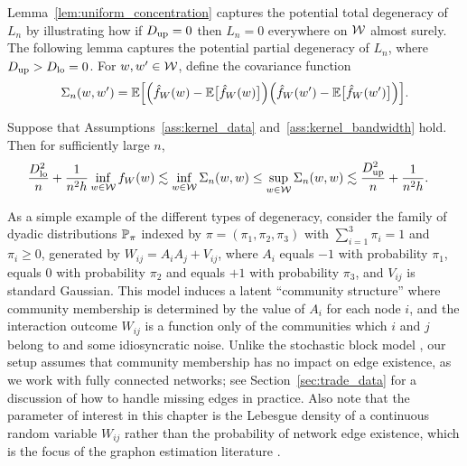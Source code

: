 Lemma~\ref{lem:uniform_concentration} captures the potential total degeneracy
of $L_n$ by illustrating how if $\Du=0$ then $L_n=0$ everywhere on $\cW$ almost
surely. The following lemma captures the potential partial degeneracy of $L_n$,
where $\Du > \Dl = 0$. For $w,w' \in \cW$, define the covariance function
%
\begin{align*}
  \Sigma_n(w,w') =
  \E\Big[
    \Big(
      \hat f_W(w)
      - \E\big[\hat f_W(w)\big]
    \Big)
    \Big(
      \hat f_W(w')
      - \E\big[\hat f_W(w')\big]
    \Big)
  \Big].
\end{align*}
%
\begin{lemma}
  \label{lem:variance_bounds}
  Suppose that Assumptions~\ref{ass:kernel_data} and~\ref{ass:kernel_bandwidth}
  hold. Then for sufficiently large $n$,
  \begin{align*}
    \frac{\Dl^2}{n} + \frac{1}{n^2h}
    \inf_{w \in \cW} f_W(w)
    &\lesssim
    \inf_{w \in \cW} \Sigma_n(w,w)
    \leq
    \sup_{w \in \cW} \Sigma_n(w,w)
    \lesssim
    \frac{\Du^2}{n} + \frac{1}{n^2h}.
  \end{align*}
\end{lemma}

As a simple example of the different types of degeneracy, consider the family
of dyadic distributions $\P_{\pi}$ indexed by $\pi = (\pi_1, \pi_2, \pi_3)$
with $\sum_{i=1}^3 \pi_i = 1$ and $\pi_i \geq 0$, generated by
$W_{i j} = A_i A_j + V_{i j}$, where $A_i$ equals $-1$ with probability
$\pi_1$, equals $0$ with probability $\pi_2$ and equals $+1$ with probability
$\pi_3$, and $V_{i j}$ is standard Gaussian. This model induces a latent
``community structure'' where community membership is determined by the value
of $A_i$ for each node $i$, and the interaction outcome $W_{i j}$ is a function
only of the communities which $i$ and $j$ belong to and some idiosyncratic
noise. Unlike the stochastic block model \citep{kolaczyk2009statistical}, our
setup assumes that community membership has no impact on edge existence, as we
work with fully connected networks; see Section~\ref{sec:trade_data} for a
discussion of how to handle missing edges in practice. Also note that the
parameter of interest in this chapter is the Lebesgue density of a continuous
random variable $W_{i j}$ rather than the probability of network edge
existence, which is the focus of the graphon estimation literature
\citep{gao2021minimax}.

